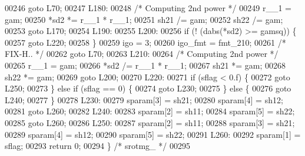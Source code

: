 \begin{DoxyCode}
00246     \textcolor{keywordflow}{goto} L70;
00247 L180:
00248 \textcolor{comment}{/* Computing 2nd power */}
00249     r\_\_1 = gam;
00250     *sd2 *= r\_\_1 * r\_\_1;
00251     sh21 /= gam;
00252     sh22 /= gam;
00253     \textcolor{keywordflow}{goto} L170;
00254 L190:
00255 L200:
00256     \textcolor{keywordflow}{if} (! (dabs(*sd2) >= gamsq)) \{
00257     \textcolor{keywordflow}{goto} L220;
00258     \}
00259     igo = 3;
00260     igo\_fmt = fmt\_210;
00261 \textcolor{comment}{/*              FIX-H.. */}
00262     \textcolor{keywordflow}{goto} L70;
00263 L210:
00264 \textcolor{comment}{/* Computing 2nd power */}
00265     r\_\_1 = gam;
00266     *sd2 /= r\_\_1 * r\_\_1;
00267     sh21 *= gam;
00268     sh22 *= gam;
00269     \textcolor{keywordflow}{goto} L200;
00270 L220:
00271     \textcolor{keywordflow}{if} (sflag < 0.f) \{
00272     \textcolor{keywordflow}{goto} L250;
00273     \} \textcolor{keywordflow}{else} \textcolor{keywordflow}{if} (sflag == 0) \{
00274     \textcolor{keywordflow}{goto} L230;
00275     \} \textcolor{keywordflow}{else} \{
00276     \textcolor{keywordflow}{goto} L240;
00277     \}
00278 L230:
00279     sparam[3] = sh21;
00280     sparam[4] = sh12;
00281     \textcolor{keywordflow}{goto} L260;
00282 L240:
00283     sparam[2] = sh11;
00284     sparam[5] = sh22;
00285     \textcolor{keywordflow}{goto} L260;
00286 L250:
00287     sparam[2] = sh11;
00288     sparam[3] = sh21;
00289     sparam[4] = sh12;
00290     sparam[5] = sh22;
00291 L260:
00292     sparam[1] = sflag;
00293     \textcolor{keywordflow}{return} 0;
00294 \} \textcolor{comment}{/* srotmg\_ */}
00295 
\end{DoxyCode}
